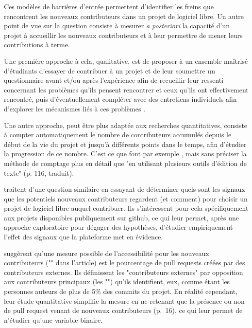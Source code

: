Ces modèles de barrières d'entrée permettent d'identifier les freins que rencontrent les nouveaux
contributeurs dans un projet de logiciel libre. Un autre point de vue sur la question consiste à mesurer
\emph{a posteriori} la capacité d'un projet à accueillir les nouveaux contributeurs et à leur permettre de
mener leurs contributions à terme.

Une première approche à cela, qualitative, est de proposer à un ensemble maîtrisé d'étudiants d'essayer de
contribuer à un projet et de leur soumettre un questionnaire avant et/ou après l'expérience afin de recueillir
leur ressenti concernant les problèmes qu'ils pensent rencontrer et ceux qu'ils ont effectivement rencontré,
puis d'éventuellement compléter avec des entretiens individuels afin d'explorer les mécanismes liés à ces
problèmes \parencites{newcomers-accessibility-2016}{newcomers-onboarding-2018}[voir
aussi][]{newcomers-adaptation-2005}.

Une autre approche, peut être plus adaptée aux recherches quantitatives, consiste à compter automatiquement le
nombre de contributeurs accumulés depuis le début de la vie du projet et jusqu'à différents points dans le
temps, afin d'étudier la progression de ce nombre. C'est ce que font par exemple
, mais sans préciser la méthode de comptage plus en détail que "en
utilisant plusieurs outils d'édition de texte" (p. 116, traduit).

 traitent d'une question similaire en essayant de déterminer quels sont les signaux
que les potentiels nouveaux contributeurs regardent (et comment) pour choisir un projet de logiciel libre
auquel contribuer. Ils s'intéressent pour cela spécifiquement aux projets disponibles publiquement sur
\gls{github}, ce qui leur permet, après une approche exploratoire pour dégager des hypothèses, d'étudier
empiriquement l'effet des signaux que la plateforme met en évidence.

\textcite{signals-2019} suggèrent qu'une mesure possible de l'accessibilité pour les nouveaux contributeurs
("" dans l'article) est le pourcentage de \glspl{pull request} créées par des
contributeurs externes. Ils définissent les "contributeurs externes" par opposition aux contributeurs
principaux (les "") qu'ils identifient, eux, comme étant les personnes auteurs de plus
de 5\% des \glspl{commit} du projet. En réalité cependant, leur étude quantitative simplifie la mesure en ne
retenant que la présence ou non de \gls{pull request} venant de nouveaux contributeurs (p.~16), ce qui leur
permet de n'étudier qu'une variable binaire.

